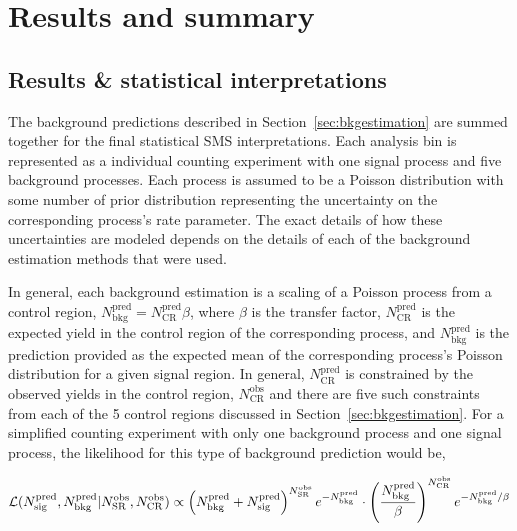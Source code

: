 \chapter{Results and summary}
\label{Chap4}
\section{Results \& statistical interpretations}
\label{sec:results}

The background predictions described in Section~\ref{sec:bkgestimation} are 
summed together for the final statistical SMS interpretations. Each analysis
bin is represented as a individual counting experiment with one 
signal process and five background processes.  Each process is assumed 
to be a Poisson distribution with some number of prior distribution representing
the uncertainty on the corresponding process's rate parameter. The exact
details of how these uncertainties are modeled depends on the 
details of each of the background estimation methods that were used. 

In general, each background estimation is a scaling of a Poisson process 
from a control region, $N^{\mathrm{pred}}_{\mathrm{bkg}}=N^{\mathrm{pred}}_{\mathrm{CR}}\beta$, where $\beta$ 
is the transfer factor, $N^{\mathrm{pred}}_{\mathrm{CR}}$ is the expected yield in the 
control region of the corresponding process, and $N^{\mathrm{pred}}_{\mathrm{bkg}}$ is the 
prediction provided as the expected mean of the corresponding process's
Poisson distribution for a given signal region.  In general,  $N^{\mathrm{pred}}_{\mathrm{CR}}$
is constrained by the observed yields in the control region, 
$N^{\mathrm{obs}}_{\mathrm{CR}}$ and there are five such constraints from each 
of the 5 control regions discussed in Section~\ref{sec:bkgestimation}.  For a 
simplified counting experiment with only one background process and one signal
process, the likelihood for this type of background prediction would be, 

\begin{equation}
\centering
\mathcal{L}(N^{\mathrm{pred}}_{\mathrm{sig}},N^{\mathrm{pred}}_{\mathrm{bkg}}|N^{\mathrm{obs}}_{\mathrm{SR}},N^{\mathrm{obs}}_{\mathrm{CR}}) \propto \left(N^{\mathrm{pred}}_{\mathrm{bkg}}+N^{\mathrm{pred}}_{\mathrm{sig}}\right)^{N^{\mathrm{obs}}_{\mathrm{SR}}}e^{-N^{\mathrm{pred}}_{\mathrm{bkg}}}\cdot\left(\frac{N^{\mathrm{pred}}_{\mathrm{bkg}}}{\beta}\right)^{N^{\mathrm{obs}}_{\mathrm{CR}}} e^{-N^{\mathrm{pred}}_{\mathrm{bkg}}/\beta}
\end{equation}

